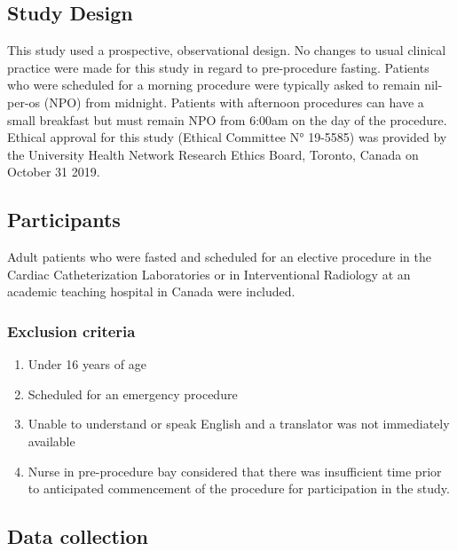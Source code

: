 \documentclass[12pt,twocolumn,twoside,]{pinp}
\providecommand{\tightlist}{%
  \setlength{\itemsep}{0pt}\setlength{\parskip}{0pt}}
\begin{document}
\hypertarget{study-design}{%
\subsection{Study Design}\label{study-design}}

This study used a prospective, observational design. No changes to usual
clinical practice were made for this study in regard to pre-procedure
fasting. Patients who were scheduled for a morning procedure were
typically asked to remain nil-per-os (NPO) from midnight. Patients with
afternoon procedures can have a small breakfast but must remain NPO from
6:00am on the day of the procedure. Ethical approval for this study
(Ethical Committee N° 19-5585) was provided by the University Health
Network Research Ethics Board, Toronto, Canada on October 31 2019.

\hypertarget{participants}{%
\subsection{Participants}\label{participants}}

Adult patients who were fasted and scheduled for an elective procedure
in the Cardiac Catheterization Laboratories or in Interventional
Radiology at an academic teaching hospital in Canada were included.

\hypertarget{exclusion-criteria}{%
\subsubsection{Exclusion criteria}\label{exclusion-criteria}}

\begin{enumerate}
\def\labelenumi{\arabic{enumi}.}
\tightlist
\item
  Under 16 years of age
\item
  Scheduled for an emergency procedure
\item
  Unable to understand or speak English and a translator was not
  immediately available
\item
  Nurse in pre-procedure bay considered that there was insufficient time
  prior to anticipated commencement of the procedure for participation
  in the study.
\end{enumerate}

\hypertarget{data-collection}{%
\subsection{Data collection}\label{data-collection}}
\end{document}
